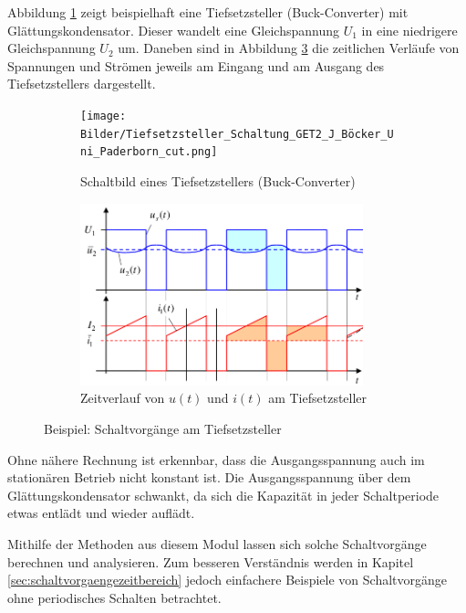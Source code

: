 \begin{frame}
{	Abbildung \ref{fig:circ:pulldown} zeigt beispielhaft eine Tiefsetzsteller (Buck-Converter) mit Glättungskondensator.
	Dieser wandelt eine Gleichspannung $U_1$ in eine niedrigere Gleichspannung $U_2$ um. 
	Daneben sind in Abbildung \ref{fig:plot:pulldown} die zeitlichen Verläufe von Spannungen und Strömen
	jeweils am Eingang und am Ausgang des Tiefsetzstellers dargestellt.

	\begin{figure}[H]\centering
		\begin{subfigure}{0.5\textwidth}\centering
			\texttt{[image: Bilder/Tiefsetzsteller\_Schaltung\_GET2\_J\_Böcker\_Uni\_Paderborn\_cut.png]}
			\caption{Schaltbild eines Tiefsetzstellers (Buck-Converter)}
			\label{fig:circ:pulldown}
		\end{subfigure}%
		\begin{subfigure}{0.5\textwidth}\centering
			\includegraphics[width=0.9\textwidth]{Bilder/Tiefsetzsteller_Zeitverläufe_GET2_J_Böcker_Uni_Paderborn_cut_edit.png}
			\caption{Zeitverlauf von $u(t)$ und $i(t)$ am Tiefsetzsteller}
			\label{fig:plot:pulldown}
		\end{subfigure}
		\caption{Beispiel: Schaltvorgänge am Tiefsetzsteller\protect\footnotemark}
	\end{figure}

	Ohne nähere Rechnung ist erkennbar, dass die Ausgangsspannung auch im stationären Betrieb nicht konstant ist.
	Die Ausgangsspannung über dem Glättungskondensator schwankt, da sich die Kapazität in jeder Schaltperiode 
	etwas entlädt und wieder auflädt. 
	
	Mithilfe der Methoden aus diesem Modul lassen sich solche Schaltvorgänge berechnen und analysieren. 
	Zum besseren Verständnis werden in Kapitel \ref{sec:schaltvorgaengezeitbereich} jedoch einfachere Beispiele von
	Schaltvorgänge ohne periodisches Schalten betrachtet.

}
\end{frame}
